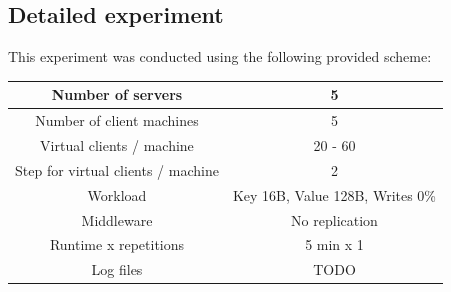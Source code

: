 \documentclass[11pt]{article}
\begin{document}
\subsection{Detailed experiment}

This experiment was conducted using the following provided scheme:
\medskip

\small{
\smallskip
\begin{tabular}{|c|c|}
\hline Number of servers & 5 \\ 
\hline Number of client machines & 5 \\ 
\hline Virtual clients / machine &  20 - 60 \\ 
\hline Step for virtual clients / machine & 2 \\
\hline Workload & Key 16B, Value 128B, Writes 0\% \\
\hline Middleware & No replication \\ 
\hline Runtime x repetitions & 5 min x 1 \\ 
\hline Log files & TODO \\
\hline 
\end{tabular} }
\medskip
\end{document}
